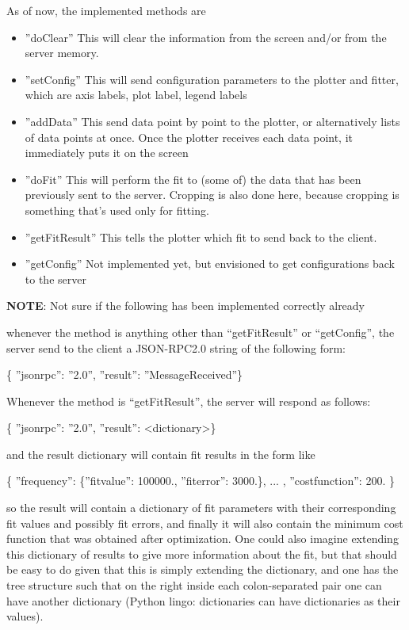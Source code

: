 \documentclass[11pt]{article} %
\begin{document}
As of now, the implemented methods are 
\begin{itemize}
\item { {''}doClear{''}} This will clear the information from the screen and/or from the server memory. 
\item { {''}setConfig{''}} This will send configuration parameters to the plotter and fitter, which are axis labels, plot label, legend labels
\item { {''}addData{''}} This send data point by point to the plotter, or alternatively lists of data points at once. Once the plotter receives each data point, it immediately puts it on the screen
\item { {''}doFit{''}} This will perform the fit to (some of) the data that has been previously sent to the server. Cropping is also done here, because cropping is something that's used only for fitting. 
\item { {''}getFitResult{''}} This tells the plotter which fit to send back to the client. 
\item { {''}getConfig{''}} Not implemented yet, but envisioned to get configurations back to the server
\end{itemize}

\textbf{NOTE}: Not sure if the following has been implemented correctly already

whenever the method is anything other than ``getFitResult'' or ``getConfig'', the server send to the client a JSON-RPC2.0 string of the following form: 

{ \{ {''}jsonrpc{''}: {''}2.0{''}, {''}result{''}: {''}MessageReceived{''}\}}

Whenever the method is ``getFitResult'', the server will respond as follows: 

{ \{ {''}jsonrpc{''}: {''}2.0{''}, {''}result{''}: <dictionary>\}}

and the result dictionary will contain fit results in the form like 

{ \{ {''}frequency{''}: \{{''}fitvalue{''}: 100000., {''}fiterror{''}: 3000.\}, ... , {''}costfunction{''}: 200. \}}

so the result will contain a dictionary of fit parameters with their corresponding fit values and possibly fit errors, and finally it will also contain the minimum cost function that was obtained after optimization.  One could also imagine extending this dictionary of results to give more information about the fit, but that should be easy to do given that this is simply extending the dictionary, and one has the tree structure such that on the right inside each colon-separated pair one can have another dictionary (Python lingo: dictionaries can have dictionaries as their values). 
\end{document}
